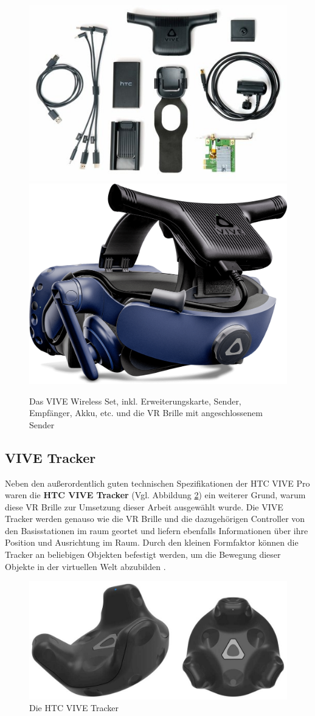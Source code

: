 \begin{figure}[h]
	\centering
	\includegraphics[width=0.4\linewidth]{Bilder/A27_WirelessKit}
	\includegraphics[width=0.32\linewidth]{Bilder/A28_Vive+Wireless}
	\caption{Das VIVE Wireless Set, inkl. Erweiterungskarte, Sender, Empfänger, Akku, etc. und die VR Brille mit angeschlossenem Sender \cite{A27,A28}}
	\label{fig:WirelessKit}
\end{figure}

\subsection{VIVE Tracker}\label{sec:TrackerVive}
Neben den außerordentlich guten technischen Spezifikationen der HTC VIVE Pro waren die \textbf{HTC VIVE Tracker} (Vgl. Abbildung \ref{fig:ViveTracker}) ein weiterer Grund, warum diese VR Brille zur Umsetzung dieser Arbeit ausgewählt wurde. Die VIVE Tracker werden genauso wie die VR Brille und die dazugehörigen Controller von den Basisstationen im raum geortet und liefern ebenfalls Informationen über ihre Position und Ausrichtung im Raum. Durch den kleinen Formfaktor können die Tracker an beliebigen Objekten befestigt werden, um die Bewegung dieser Objekte in der virtuellen Welt abzubilden \cite{30}.
\newline
\begin{figure}[h]
	\centering
	\includegraphics[width=0.42\linewidth]{Bilder/A29_ViveTracker}
	\caption{Die HTC VIVE Tracker \cite{A29}}
	\label{fig:ViveTracker}
\end{figure}

